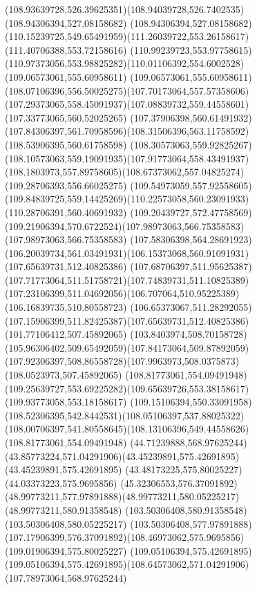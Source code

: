 {{\curveto(108.93639728,526.39625351)(108.94039728,526.7402535)(108.94306394,527.08158682)
\curveto(108.94306394,527.08158682)(110.15239725,549.65491959)(111.26039722,553.26158617)
\lineto(111.40706388,553.72158616)
\lineto(110.99239723,553.97758615)
\curveto(110.97373056,553.98825282)(110.01106392,554.6002528)(109.06573061,555.60958611)
\curveto(109.06573061,555.60958611)(108.07106396,556.50025275)(107.70173064,557.57358606)
\curveto(107.29373065,558.45091937)(107.08839732,559.44558601)(107.33773065,560.52025265)
\curveto(107.37906398,560.61491932)(107.84306397,561.70958596)(108.31506396,563.11758592)
\lineto(108.53906395,560.61758598)
\curveto(108.30573063,559.92825267)(108.10573063,559.19091935)(107.91773064,558.43491937)
\curveto(108.1803973,557.89758605)(108.67373062,557.04825274)(109.28706393,556.66025275)
\curveto(109.54973059,557.92558605)(109.84839725,559.14425269)(110.22573058,560.23091933)
\lineto(110.28706391,560.40691932)
\lineto(109.20439727,572.47758569)
\curveto(109.21906394,570.6722524)(107.98973063,566.75358583)(107.98973063,566.75358583)
\curveto(107.58306398,564.28691923)(106.20039734,561.03491931)(106.15373068,560.91091931)
\moveto(107.65639731,512.40825386)
\curveto(107.68706397,511.95625387)(107.71773064,511.51758721)(107.74839731,511.10825389)
\curveto(107.23106399,511.04692056)(106.707064,510.95225389)(106.16839735,510.80558723)
\curveto(106.65373067,511.28292055)(107.15906399,511.82425387)(107.65639731,512.40825386)
\moveto(101.77106412,507.45892065)
\curveto(103.8403974,508.70158728)(105.96306402,509.65492059)(107.84173064,509.87892059)
\curveto(107.92306397,508.86558728)(107.9963973,508.0375873)(108.0523973,507.45892065)
\closepath
\moveto(108.81773061,554.09491948)
\curveto(109.25639727,553.69225282)(109.65639726,553.38158617)(109.93773058,553.18158617)
\curveto(109.15106394,550.33091958)(108.52306395,542.8442531)(108.05106397,537.88025322)
\curveto(108.00706397,541.80558645)(108.13106396,549.44558626)(108.81773061,554.09491948)
\moveto(44.71239888,568.97625244)
\curveto(43.85773224,571.04291906)(43.45239891,575.42691895)(43.45239891,575.42691895)
\lineto(43.48173225,575.80025227)
\lineto(44.03373223,575.9695856)
\curveto(45.32306553,576.37091892)(48.99773211,577.97891888)(48.99773211,580.05225217)
\lineto(48.99773211,580.91358548)
\lineto(103.50306408,580.91358548)
\lineto(103.50306408,580.05225217)
\curveto(103.50306408,577.97891888)(107.17906399,576.37091892)(108.46973062,575.9695856)
\lineto(109.01906394,575.80025227)
\lineto(109.05106394,575.42691895)
\curveto(109.05106394,575.42691895)(108.64573062,571.04291906)(107.78973064,568.97625244)
}}
